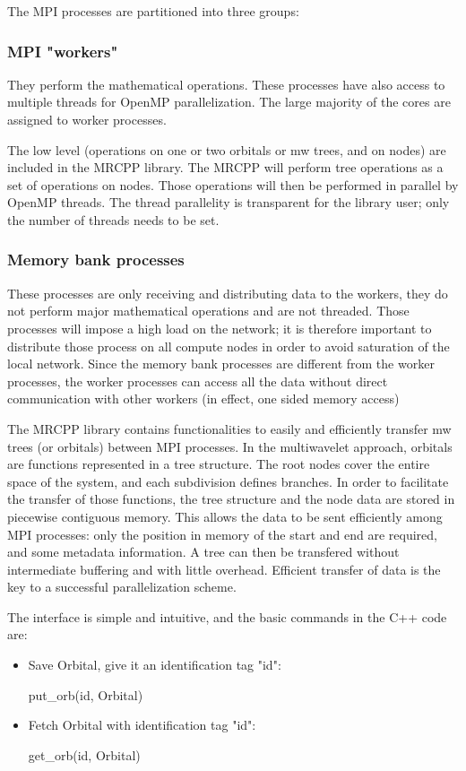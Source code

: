 \documentclass{article}
\begin{document}
The MPI processes are partitioned into three groups:

\subsubsection{MPI "workers"} 
They perform the mathematical operations. These processes have also access to multiple threads for OpenMP parallelization. The large majority of the cores are assigned to worker processes.

The low level (operations on one or two orbitals or mw trees, and on nodes) are included  in the MRCPP library. The MRCPP will perform tree operations as a set of operations on nodes. Those operations will then be performed in parallel by OpenMP threads. The thread parallelity is transparent for the library user; only the number of threads needs to be set.


\subsubsection{Memory bank processes} 
These processes are only receiving and distributing data to the workers, they do not perform major mathematical operations and are not threaded. Those processes will impose a high load on the network; it is therefore important to distribute those process on all compute nodes in order to avoid saturation of the local network. Since the memory bank processes are different from the worker processes, the worker processes can access all the data without direct communication with other workers (in effect, one sided memory access)

The MRCPP library contains functionalities to easily and efficiently transfer mw trees (or orbitals) between MPI processes. 
In the multiwavelet approach, orbitals are functions represented in a tree structure. The root nodes cover the entire space of the system, and each subdivision defines branches. In order to facilitate the transfer of those functions, the tree structure and the node data are stored in piecewise contiguous memory. This allows the data to be sent efficiently among MPI processes: only the position in memory of the start and end are required, and some metadata information. A tree can then be transfered without intermediate buffering and with little overhead. Efficient transfer of data is the key to a successful parallelization scheme.

The interface is simple and intuitive, and the basic commands in the C++ code are:
\begin{itemize}
    \item Save Orbital, give it an identification tag "id": 
    
put\_orb(id, Orbital)
\item Fetch Orbital with  identification tag "id": 

get\_orb(id, Orbital)

\end{itemize}
\end{document}
